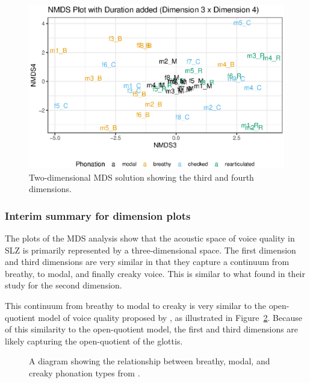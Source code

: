\begin{figure}[h!]
    \centering
    \includegraphics[width = 0.75\linewidth]{images/MDS/nmds34_dur.eps}
    \caption{Two-dimensional MDS solution showing the third and fourth dimensions.}
    \label{fig:nmds34}
\end{figure}


\subsubsection{Interim summary for dimension plots} \label{sec:acousticlandscape:inter_sum}

The plots of the MDS analysis show that the acoustic space of voice quality in SLZ is primarily represented by a three-dimensional space. The first dimension and third dimensions are very similar in that they capture a continuum from breathy, to modal, and finally creaky voice. This is similar to what \citet{keatingCrosslanguageAcousticSpace2023} found in their study for the second dimension. 

This continuum from breathy to modal to creaky is very similar to the open-quotient model of voice quality proposed by \citet{gordonPhonationTypesCrosslinguistic2001}, as illustrated in Figure~\ref{fig:phonation_types}. Because of this similarity to the open-quotient model, the first and third dimensions are likely capturing the open-quotient of the glottis. 

\begin{figure}[h!]
    \centering
    \caption{A diagram showing the relationship between breathy, modal, and creaky phonation types from \citet{gordonPhonationTypesCrosslinguistic2001}.}
    \label{fig:phonation_types}
\end{figure}

